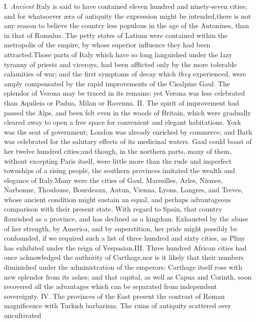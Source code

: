 I. \textit{Ancient} Italy is said to have contained eleven hundred and
ninety-seven cities; and for whatsoever æra of antiquity the
expression might be intended,\footnotemark[74] there is not any reason to
believe the country less populous in the age of the Antonines,
than in that of Romulus. The petty states of Latium were
contained within the metropolis of the empire, by whose superior
influence they had been attracted.\footnotemark[741] Those parts of Italy which
have so long languished under the lazy tyranny of priests and
viceroys, had been afflicted only by the more tolerable
calamities of war; and the first symptoms of decay which \textit{they}
experienced, were amply compensated by the rapid improvements of
the Cisalpine Gaul. The splendor of Verona may be traced in its
remains: yet Verona was less celebrated than Aquileia or Padua,
Milan or Ravenna. II. The spirit of improvement had passed the
Alps, and been felt even in the woods of Britain, which were
gradually cleared away to open a free space for convenient and
elegant habitations. York was the seat of government; London was
already enriched by commerce; and Bath was celebrated for the
salutary effects of its medicinal waters. Gaul could boast of her
twelve hundred cities;\footnotemark[75] and though, in the northern parts, many
of them, without excepting Paris itself, were little more than
the rude and imperfect townships of a rising people, the southern
provinces imitated the wealth and elegance of Italy.\footnotemark[76] Many were
the cities of Gaul, Marseilles, Arles, Nismes, Narbonne,
Thoulouse, Bourdeaux, Autun, Vienna, Lyons, Langres, and Treves,
whose ancient condition might sustain an equal, and perhaps
advantageous comparison with their present state. With regard to
Spain, that country flourished as a province, and has declined as
a kingdom. Exhausted by the abuse of her strength, by America,
and by superstition, her pride might possibly be confounded, if
we required such a list of three hundred and sixty cities, as
Pliny has exhibited under the reign of Vespasian.\footnotemark[77] III. Three
hundred African cities had once acknowledged the authority of
Carthage,\footnotemark[78] nor is it likely that their numbers diminished under
the administration of the emperors: Carthage itself rose with new
splendor from its ashes; and that capital, as well as Capua and
Corinth, soon recovered all the advantages which can be separated
from independent sovereignty. IV. The provinces of the East
present the contrast of Roman magnificence with Turkish
barbarism. The ruins of antiquity scattered over uncultivated

